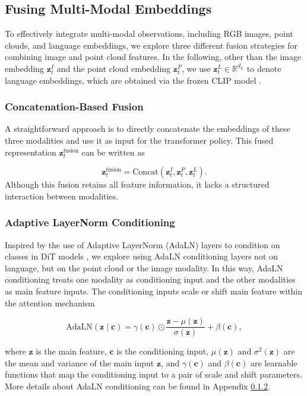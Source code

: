 \subsection{Fusing Multi-Modal Embeddings}
\label{sec:modality_fusion}

To effectively integrate multi-modal observations, including RGB images, point clouds, and language embeddings, we explore three different fusion strategies for combining image and point cloud features. In the following, other than the image embedding $ \mathbf{z}_t^I$ and the point cloud embedding $\mathbf{z}_t^P$, we use $\mathbf{z}_t^L \in \mathbb{R}^{d_L}$ to denote language embeddings, which are obtained via the frozen CLIP model \cite{radford2021learningtransferablevisualmodels}.

\subsubsection{Concatenation-Based Fusion}
A straightforward approach is to directly concatenate the embeddings of these three modalities and use it as input for the transformer policy. This fused representation $\mathbf{z}_t^{\text{fusion}}$ can be written as

\begin{equation}
    \mathbf{z}_t^{\text{fusion}} = \text{Concat}(\mathbf{z}_t^I, \mathbf{z}_t^P, \mathbf{z}_t^L).
\end{equation}
Although this fusion retains all feature information, it lacks a structured interaction between modalities.

\subsubsection{Adaptive LayerNorm Conditioning}
\label{sec:adaln}
Inspired by the use of Adaptive LayerNorm (AdaLN) layers to condition on classes in DiT models \cite{Peebles2022DiT}, we explore using AdaLN conditioning layers not on language, but on the point cloud or the image modality. In this way, AdaLN conditioning treats one modality as conditioning input and the other modalities as main feature inputs.
The conditioning inputs scale or shift main feature within the attention mechanism

\[
\text{AdaLN}(\mathbf{z} \mid \mathbf{\mathbf{c}}) = \gamma(\mathbf{c}) \odot \frac{\mathbf{z} - \mu(\mathbf{z})}{\sigma(\mathbf{z})} + \beta(\mathbf{c}),
\]

where $\mathbf{z}$ is the main feature, $\mathbf{c}$ is the conditioning input, $\mu(\mathbf{z})$ and $\sigma^2(\mathbf{z})$ are the mean and variance of the main input $\mathbf{z}$, and $\gamma(\mathbf{c})$ and $\beta(\mathbf{c})$ are learnable functions that map the conditioning input to a pair of scale and shift parameters. More details about AdaLN conditioning can be found in Appendix \ref{sec:adaln}.

